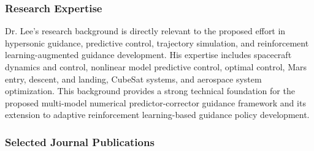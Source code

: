 \subsubsection{Research Expertise}

Dr. Lee's research background is directly relevant to the proposed effort in hypersonic guidance, predictive control, trajectory simulation, and reinforcement learning-augmented guidance development. His expertise includes spacecraft dynamics and control, nonlinear model predictive control, optimal control, Mars entry, descent, and landing, CubeSat systems, and aerospace system optimization. This background provides a strong technical foundation for the proposed multi-model numerical predictor-corrector guidance framework and its extension to adaptive reinforcement learning-based guidance policy development.

\subsubsection{Selected Journal Publications}

